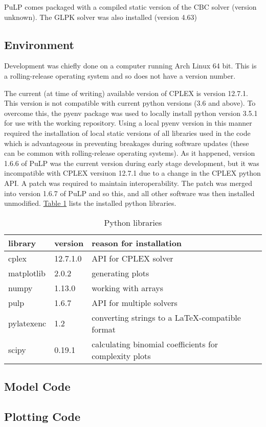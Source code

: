 PuLP comes packaged with a compiled static version of the CBC solver (version
unknown).
The GLPK solver was also installed (version 4.63)

\subsection{Environment}\label{SS.envir}

Development was chiefly done on a computer running Arch Linux 64 bit.
This is a rolling-release operating system and so does not have a version
number.

The current (at time of writing) available version of CPLEX is version 12.7.1.
This version is not compatible with current python versions (3.6 and above).
To overcome this, the pyenv package was used to locally install python version
3.5.1 for use with the working repository.
Using a local pyenv version in this manner required the installation of local
static versions of all libraries used in the code which is advantageous in
preventing breakages during software updates (these can be common with
rolling-release operating systems).
As it happened, version 1.6.6 of PuLP was the current version during early
stage development, but it was incompatible with CPLEX versiuon 12.7.1 due to a
change in the CPLEX python API.  A patch was required to maintain
interoperability.  The patch was merged into version 1.6.7 of PuLP and so this,
and all other software was then installed unmodified.
\hyperref[tbl.libs]{Table \ref*{tbl.libs}} lists the installed python
libraries.

\begin{table}[h!]
    \centering
    \caption{Python libraries}
    \label{tbl.libs}
    \begin{tabular}{l  l  l }
        library & version & reason for installation\\ \hline
        cplex & 12.7.1.0 & API for CPLEX solver \\
        matplotlib & 2.0.2 & generating plots \\
        numpy & 1.13.0 & working with arrays \\
        pulp & 1.6.7 & API for multiple solvers \\
        pylatexenc & 1.2 & converting strings to a \LaTeX-compatible format \\
        scipy & 0.19.1 & calculating binomial coefficients for complexity
            plots \\
    \end{tabular}
\end{table}

\subsection{Model Code}\label{SS.modelcode}

\subsection{Plotting Code}\label{SS.plotcode}


